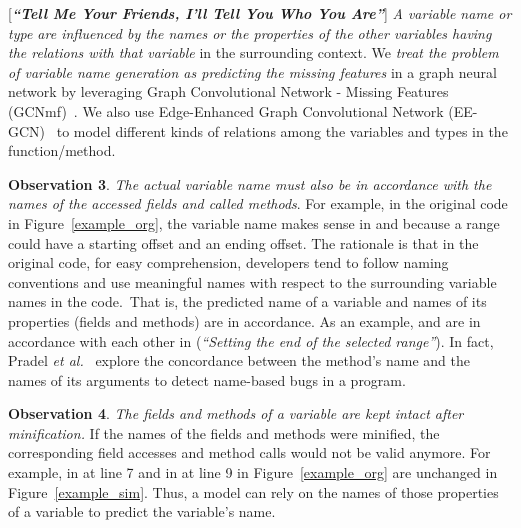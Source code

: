 
\vspace{2pt}
 [{\bf {\em ``Tell Me Your Friends, I'll Tell
    You Who You Are''}}]
          {\em A variable name or type are influenced by the
  names or the properties of the other variables having the relations
  with that variable} in the surrounding context. We {\em treat the
  problem of variable name generation as predicting the missing
  features} in a graph neural network by leveraging Graph Convolutional
Network - Missing Features (GCNmf)~\cite{GCNmf}.  We also use
Edge-Enhanced Graph Convolutional Network (EE-GCN)~\cite{ee-gcn} to
model different kinds of relations among the
variables and types in the function/method.



\vspace{2pt} \textbf{Observation 3}. {\em The actual variable name
  must also be in accordance with the names of the accessed fields and
  called methods}. For example, in the original code in
Figure~\ref{example_org}, the variable name  makes sense
in  and  because a
range could have a starting offset and an ending offset. The rationale
is that in the original code, for easy comprehension, developers tend
to follow naming conventions and use meaningful names with respect to
the surrounding variable names in the code.~That is, the predicted
name of a variable and names of its properties (fields and methods)
are in accordance. As an example,  and
 are in accordance with each other in
 ({\em ``Setting the end of the
  selected range''}). In fact, Pradel {\em et
  al.}~\cite{deepbugs-oopsla18} explore the concordance between the
method's name and the names of its arguments to detect name-based bugs
in a program.


\vspace{2pt}
\textbf{Observation 4}. {\em The fields and methods of a variable are
  kept intact after minification.} If the names of the fields and
methods were minified, the corresponding field accesses and method
calls would not be valid anymore. For example,  in
 at line 7 and  in
 at line 9 in Figure~\ref{example_org} are
unchanged in Figure~\ref{example_sim}. Thus, a model can rely
on the names of those properties of a variable to predict the
variable's name.

